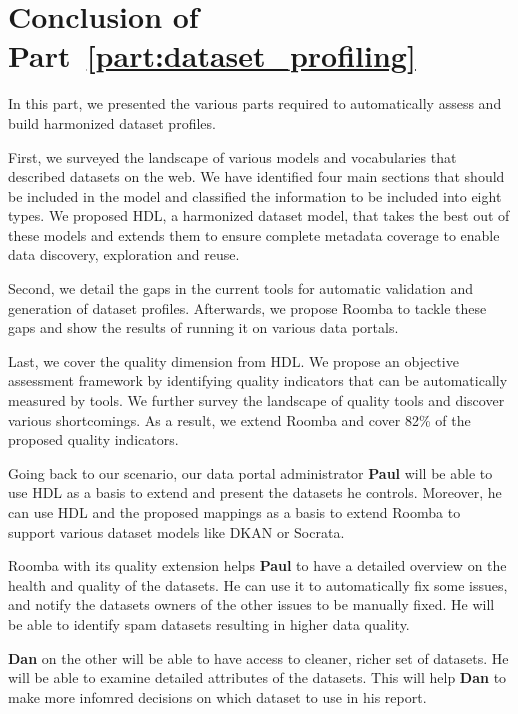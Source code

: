 \chapter*{Conclusion of Part~\ref{part:dataset_profiling}}

In this part, we presented the various parts required to automatically assess and build harmonized dataset profiles.

First, we surveyed the landscape of various models and vocabularies that described datasets on the web. We have identified four main sections that should be included in the model and classified the information to be included into eight types. We proposed HDL, a harmonized dataset model, that takes the best out of these models and extends them to ensure complete metadata coverage to enable data discovery, exploration and reuse.

Second, we detail the gaps in the current tools for automatic validation and generation of dataset profiles. Afterwards, we propose Roomba to tackle these gaps and show the results of running it on various data portals.

Last, we cover the quality dimension from HDL. We propose an objective assessment framework by identifying quality indicators that can be automatically measured by tools. We further survey the landscape of quality tools and discover various shortcomings. As a result, we extend Roomba and cover 82\% of the proposed quality indicators.

Going back to our scenario, our data portal administrator \textbf{Paul} will be able to use HDL as a basis to extend and present the datasets he controls. Moreover, he can use HDL and the proposed mappings as a basis to extend Roomba to support various dataset models like DKAN or Socrata.

Roomba with its quality extension helps \textbf{Paul} to have a detailed overview on the health and quality of the datasets. He can use it to automatically fix some issues, and notify the datasets owners of the other issues to be manually fixed. He will be able to identify spam datasets resulting in higher data quality.

\textbf{Dan} on the other will be able to have access to cleaner, richer set of datasets. He will be able to examine detailed attributes of the datasets. This will help \textbf{Dan} to make more infomred decisions on which dataset to use in his report.



